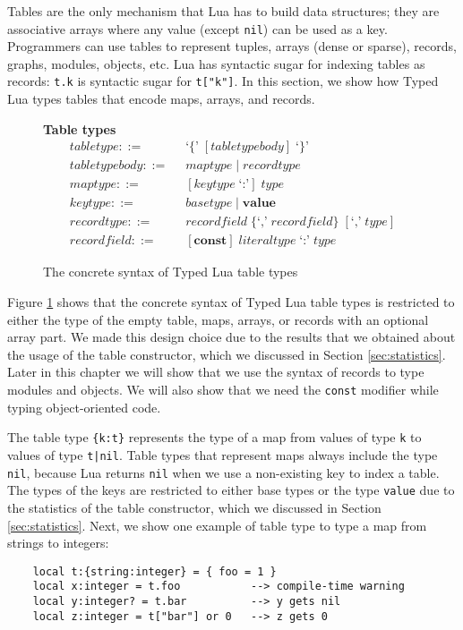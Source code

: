 Tables are the only mechanism that Lua has to build data structures;
they are associative arrays where any value (except \texttt{nil})
can be used as a key.
Programmers can use tables to represent tuples, arrays (dense or sparse),
records, graphs, modules, objects, etc.
Lua has syntactic sugar for indexing tables as records:
\texttt{t.k} is syntactic sugar for \texttt{t["k"]}.
In this section, we show how Typed Lua types tables that encode maps,
arrays, and records.

\begin{figure}[!ht]
\textbf{Table types}\\
\dstart
\begin{align*}
\textit{tabletype} ::= & \;\; \texttt{`\{'} \; [\textit{tabletypebody}] \; \texttt{`\}'}\\
\textit{tabletypebody} ::= & \;\; \textit{maptype} \; | \;
  \textit{recordtype}\\
\textit{maptype} ::= & \;\; [\textit{keytype} \; \texttt{`:'}] \; \textit{type}\\
\textit{keytype} ::= & \;\; \textit{basetype} \; | \;
  \textbf{value}\\
\textit{recordtype} ::= & \;\; \textit{recordfield} \; \{\texttt{`,'} \; \textit{recordfield}\} \; [\texttt{`,'} \; \textit{type}]\\
\textit{recordfield} ::= & \;\; [\textbf{const}] \; \textit{literaltype} \; \texttt{`:'} \; \textit{type}
\end{align*}
\dend
\caption{The concrete syntax of Typed Lua table types}
\label{fig:tables}
\end{figure}

Figure \ref{fig:tables} shows that the concrete syntax of Typed Lua
table types is restricted to either the type of the empty table,
maps, arrays, or records with an optional array part.
We made this design choice due to the results that we obtained
about the usage of the table constructor, which we discussed
in Section \ref{sec:statistics}.
Later in this chapter we will show that we use the syntax of records
to type modules and objects.
We will also show that we need the \texttt{const} modifier while
typing object-oriented code.

The table type \texttt{\{k:t\}} represents the type of a map
from values of type \texttt{k} to values of type \texttt{t|nil}.
Table types that represent maps always include the type \texttt{nil},
because Lua returns \texttt{nil} when we use a non-existing key to
index a table. 
The types of the keys are restricted to either base types or the
type \texttt{value} due to the statistics of the table constructor,
which we discussed in Section \ref{sec:statistics}.
Next, we show one example of table type to type a map from strings to integers:
\begin{verbatim}
    local t:{string:integer} = { foo = 1 } 
    local x:integer = t.foo           --> compile-time warning
    local y:integer? = t.bar          --> y gets nil
    local z:integer = t["bar"] or 0   --> z gets 0 
\end{verbatim}

